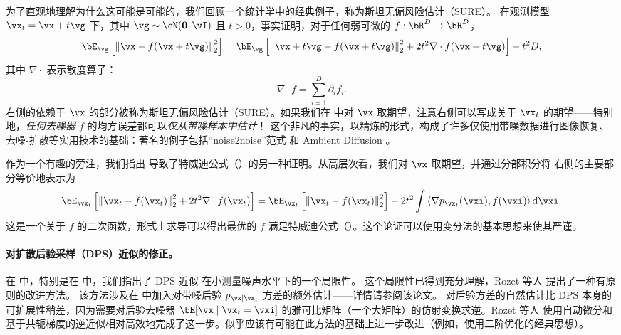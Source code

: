 \documentclass[../../book-main.tex]{subfiles}
\begin{document}
为了直观地理解为什么这可能是可能的，我们回顾一个统计学中的经典例子，称为斯坦无偏风险估计（SURE）。
在观测模型 $\vx_t = \vx + t \vg$ 下，其中 $\vg \sim \cN(\Zero, \vI)$ 且 $t>0$，事实证明，对于任何弱可微的 $f : \bR^D \to \bR^D$，
\begin{equation}\label{eq:sure-risk}
  \bE_{\vg}\left[
    \norm*{\vx - f(\vx + t \vg)}_2^2
    \right]
  =
  \bE_{\vg}\left[
    \norm*{\vx+t\vg - f(\vx + t \vg)}_2^2
    + 2t^2 \nabla \cdot f(\vx + t\vg)
    \right]
  - t^2 D,
\end{equation}
其中 $\nabla \cdot$ 表示散度算子：
\begin{equation*}
	\nabla \cdot f = \sum_{i=1}^D \partial_i f_i.
\end{equation*}
 右侧的依赖于 $\vx$ 的部分被称为斯坦无偏风险估计（SURE）。如果我们在  中对 $\vx$ 取期望，注意右侧可以写成关于 $\vx_t$ 的期望——特别地，\textit{任何去噪器 $f$} 的均方误差都可以\textit{仅从带噪样本中估计}！
这个非凡的事实，以精炼的形式，构成了许多仅使用带噪数据进行图像恢复、去噪-扩散等实用技术的基础：著名的例子包括“noise2noise”范式 \cite{pmlr-v80-lehtinen18a} 和 Ambient Diffusion \cite{daras2023ambient}。

作为一个有趣的旁注，我们指出  导致了特威迪公式（）的另一种证明。从高层次看，我们对 $\vx$ 取期望，并通过分部积分将  右侧的主要部分等价地表示为
\begin{equation}
  \bE_{\vx_t}\left[
    \norm*{\vx_t - f(\vx_t)}_2^2
    + 2t^2 \nabla \cdot f(\vx_t)
    \right]
  =
  \bE_{\vx_t}\left[
    \norm*{\vx_t - f(\vx_t)}_2^2
    \right]
  - 2t^2 \int
  \ip*{\nabla p_{\vx_t}(\vxi)}{f(\vxi)}
  \odif \vxi.
\end{equation}
这是一个关于 $f$ 的二次函数，形式上求导可以得出最优的 $f$ 满足特威迪公式（）。这个论证可以使用变分法的基本思想来使其严谨。


\paragraph{对扩散后验采样（DPS）近似的修正。}
在  中，特别是在  中，我们指出了 DPS 近似  在小测量噪声水平下的一个局限性。
这个局限性已得到充分理解，Rozet 等人 \cite{rozet2024learning} 提出了一种有原则的改进方法。
该方法涉及在  中加入对带噪后验 $p_{\vx \mid \vx_t}$ 方差的额外估计——详情请参阅该论文。
对后验方差的自然估计比 DPS 本身的可扩展性稍差，因为需要对后验去噪器 $\bE[\vx \mid \vx_t=\vxi]$ 的雅可比矩阵（一个大矩阵）的仿射变换求逆。Rozet 等人 \cite{rozet2024learning} 使用自动微分和基于共轭梯度的逆近似相对高效地完成了这一步。似乎应该有可能在此方法的基础上进一步改进（例如，使用二阶优化的经典思想）。
\end{document}
